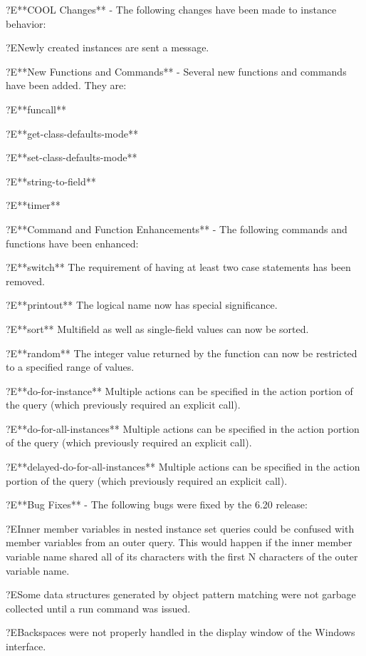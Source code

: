 \documentclass[letterpaper,10pt,english]{sphinxmanual}
\begin{document}
?E**COOL Changes** - The following changes have been made to instance
behavior:

?ENewly created instances are sent a  message.

?E**New Functions and Commands** - Several new functions and commands
have been added. They are:

?E**funcall**

?E**get-class-defaults-mode**

?E**set-class-defaults-mode**

?E**string-to-field**

?E**timer**

?E**Command and Function Enhancements** - The following commands and
functions have been enhanced:

?E**switch** The requirement of having at least two case statements has
been removed.

?E**printout** The logical name  now has special significance.

?E**sort** Multifield as well as single-field values can now be sorted.

?E**random** The integer value returned by the function can now be
restricted to a specified range of values.

?E**do-for-instance** Multiple actions can be specified in the action
portion of the query (which previously required an explicit 
call).

?E**do-for-all-instances** Multiple actions can be specified in the
action portion of the query (which previously required an explicit
 call).

?E**delayed-do-for-all-instances** Multiple actions can be specified in
the action portion of the query (which previously required an explicit
 call).

?E**Bug Fixes** - The following bugs were fixed by the 6.20 release:

?EInner member variables in nested instance set queries could be
confused with member variables from an outer query. This would happen if
the inner member variable name shared all of its characters with the
first N characters of the outer variable name.

?ESome data structures generated by object pattern matching were not
garbage collected until a run command was issued.

?EBackspaces were not properly handled in the display window of the
Windows interface.
\end{document}
